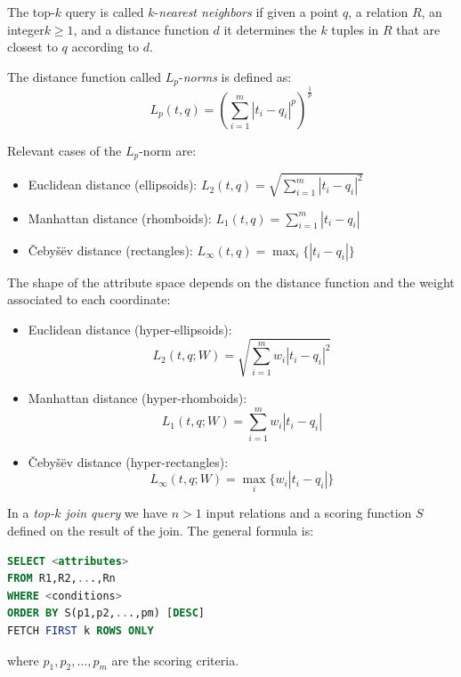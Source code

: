 \documentclass[12pt, a4paper]{report}
\newtheorem[style=M,bodystyle=\normalfont]{theorem}{Theorem}
\newtheorem[style=M,bodystyle=\normalfont]{corollary}{Corollary}
\newtheorem[style=M,bodystyle=\normalfont]{lemma}{Lemma}
\newtheorem[style=M,bodystyle=\normalfont]{definition}{Definition}
\begin{document}
    \begin{definition}
        The top-$k$ query is called $k$-\emph{nearest neighbors} if given a point $q$, a relation $R$, an integer$k \geq 1$, and a distance function $d$ it determines the $k$ tuples 
        in $R$ that are closest to $q$ according to $d$. 

        The distance function called $L_p$-\emph{norms} is defined as:
        \[L_p(t,q)=\left(\sum_{i=1}^{m}{\left\lvert t_i-q_i \right\rvert^{p}}\right)^{\frac{1}{p}}\]
    \end{definition}
    Relevant cases of the $L_p$-norm are: 
    \begin{itemize}
        \item Euclidean distance (ellipsoids): $L_2(t,q)=\sqrt{\sum_{i=1}^{m}{\left\lvert t_i-q_i \right\rvert^{2}}}$
        \item Manhattan distance (rhomboids): $L_1(t,q)=\sum_{i=1}^{m}{\left\lvert t_i-q_i \right\rvert}$
        \item Čebyšëv distance (rectangles): $L_{\infty}(t,q)=\max_{i}\{\left\lvert t_i-q_i\right\rvert\}$
    \end{itemize}
    The shape of the attribute space depends on the distance function and the weight associated to each coordinate: 
    \begin{itemize}
        \item Euclidean distance (hyper-ellipsoids):
            \[L_2(t,q;W)=\sqrt{\sum_{i=1}^{m}{w_i\left\lvert t_i-q_i \right\rvert^{2}}}\]
        \item Manhattan distance (hyper-rhomboids): 
            \[L_1(t,q;W)=\sum_{i=1}^{m}{w_i\left\lvert t_i-q_i \right\rvert}\]
        \item Čebyšëv distance (hyper-rectangles): 
            \[L_{\infty}(t,q;W)=\max_{i}\{w_i \left\lvert t_i-q_i\right\rvert\}\]
    \end{itemize}
    \begin{definition}
        In a \emph{top-$k$ join query} we have $n > 1$ input relations and a scoring function $S$ defined on the result of the join. The general formula is: 
        \begin{lstlisting}[language=SQL]
SELECT <attributes>
FROM R1,R2,...,Rn
WHERE <conditions>
ORDER BY S(p1,p2,...,pm) [DESC]
FETCH FIRST k ROWS ONLY             
        \end{lstlisting}
        where $p_1,p_2,\dots,p_m$ are the scoring criteria. 
    \end{definition}
\end{document}

